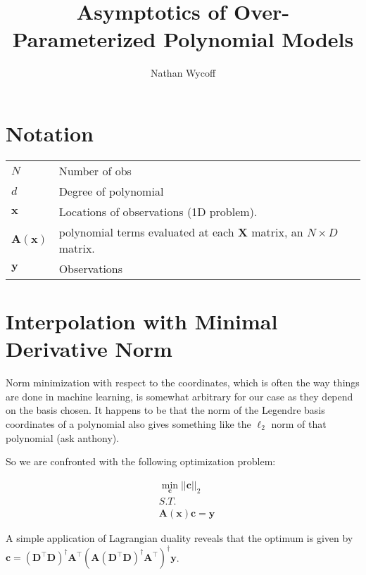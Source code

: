 \documentclass{article}
\title{Asymptotics of Over-Parameterized Polynomial Models}
\author{Nathan Wycoff}
\begin{document}
	\maketitle
	
	\section{Notation}
	
	\begin{table}[h]
		\begin{tabular}{ll}
			$N$ &Number of obs\\
			$d$ & Degree of polynomial\\
			$\mathbf{x}$ & Locations of observations (1D problem). \\
			$\mathbf{A}(\mathbf{x})$ & polynomial terms evaluated at each $\mathbf{X}$ matrix, an $N\times D$ matrix. \\
			$\mathbf{y}$ & Observations
		\end{tabular}
	\end{table}
	
	\section{Interpolation with Minimal Derivative Norm}
	
	Norm minimization with respect to the coordinates, which is often the way things are done in machine learning, is somewhat arbitrary for our case as they depend on the basis chosen. It happens to be that the norm of the Legendre basis coordinates of a polynomial also gives something like the $\ell_2$ norm of that polynomial (ask anthony).
	
	So we are confronted with the following optimization problem:
	
	\begin{align*}
		& \min_{\mathbf{c}} ||\mathbf{c}||_2 \\
		& S.T. \\
		& \mathbf{A}(\mathbf{x}) \mathbf{c} = \mathbf{y}
	\end{align*}
	
	A simple application of Lagrangian duality reveals that the optimum is given by $\mathbf{c} = (\mathbf{D}^\top\mathbf{D})^\dagger \mathbf{A}^\top (\mathbf{A} (\mathbf{D}^\top\mathbf{D})^\dagger \mathbf{A}^\top)^\dagger \mathbf{y}$.
	
\end{document}
